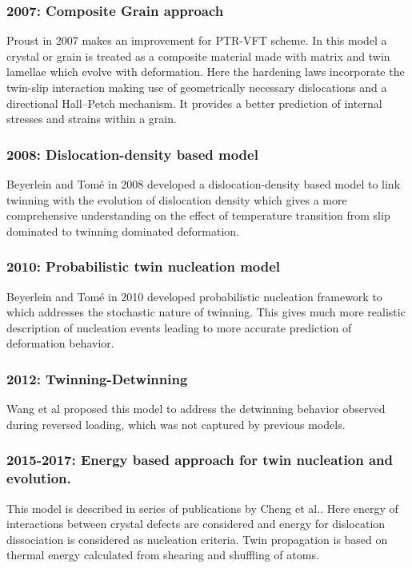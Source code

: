 \subsubsection{2007: Composite Grain approach}
\vspace{-0.8em}
Proust in 2007 \cite{PROUST20072137} makes an improvement for PTR-VFT scheme. In this model a crystal or grain is treated as a composite material made with matrix and twin lamellae which evolve with deformation. Here the hardening laws incorporate the twin-slip interaction making use of geometrically necessary dislocations and a directional Hall–Petch mechanism. It provides a better prediction of internal stresses and strains within a grain.
\vspace{-0.8em}
\subsubsection{2008: Dislocation-density based model}
\vspace{-0.8em}
Beyerlein and Tomé in 2008 \cite{BEYERLEIN2008867} developed a dislocation-density based model to link twinning with the evolution of dislocation density which gives a more comprehensive understanding on the effect of temperature transition from slip dominated to twinning dominated deformation.
\vspace{-0.8em}
\subsubsection{2010: Probabilistic twin nucleation model}
\vspace{-0.8em}
Beyerlein and Tomé in 2010\cite{beyerlein2010probabilistic} developed probabilistic nucleation framework to which addresses the stochastic nature of twinning. This gives much more realistic description of nucleation events leading to more accurate prediction of deformation behavior.
\vspace{-0.8em}
\subsubsection{2012: Twinning-Detwinning}
\vspace{-0.8em}
Wang et al \cite{WANG201293} proposed this model to address the detwinning behavior observed during reversed loading, which was not captured by previous models.
\vspace{-0.8em}
\subsubsection{2015-2017: Energy based approach for twin nucleation and evolution.}
\vspace{-0.8em}
This model is described in series of publications by Cheng et al.\cite{CHENG2015148}\cite{CHENG2017512}. Here energy of interactions between crystal defects are considered and energy for dislocation dissociation is considered as nucleation criteria. Twin propagation is based on thermal energy calculated from shearing and shuffling of atoms. 
\vspace{-0.8em}

